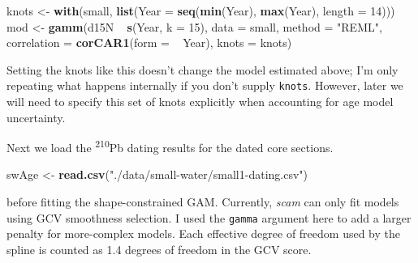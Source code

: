 \documentclass[12pt,]{article}
\newenvironment{Shaded}{\begin{snugshade}}{\end{snugshade}}
\newcommand{\KeywordTok}[1]{\textcolor[rgb]{0.13,0.29,0.53}{\textbf{{#1}}}}
\newcommand{\DataTypeTok}[1]{\textcolor[rgb]{0.13,0.29,0.53}{{#1}}}
\newcommand{\DecValTok}[1]{\textcolor[rgb]{0.00,0.00,0.81}{{#1}}}
\newcommand{\FloatTok}[1]{\textcolor[rgb]{0.00,0.00,0.81}{{#1}}}
\newcommand{\StringTok}[1]{\textcolor[rgb]{0.31,0.60,0.02}{{#1}}}
\newcommand{\NormalTok}[1]{{#1}}
\begin{document}
\begin{Shaded}
\begin{Highlighting}[]
\NormalTok{knots <-}\StringTok{ }\KeywordTok{with}\NormalTok{(small, }\KeywordTok{list}\NormalTok{(}\DataTypeTok{Year =} \KeywordTok{seq}\NormalTok{(}\KeywordTok{min}\NormalTok{(Year), }\KeywordTok{max}\NormalTok{(Year), }\DataTypeTok{length =} \DecValTok{14}\NormalTok{)))}
\NormalTok{mod <-}\StringTok{ }\KeywordTok{gamm}\NormalTok{(d15N ~}\StringTok{ }\KeywordTok{s}\NormalTok{(Year, }\DataTypeTok{k =} \DecValTok{15}\NormalTok{), }\DataTypeTok{data =} \NormalTok{small, }\DataTypeTok{method =} \StringTok{"REML"}\NormalTok{,}
            \DataTypeTok{correlation =} \KeywordTok{corCAR1}\NormalTok{(}\DataTypeTok{form =} \NormalTok{~}\StringTok{ }\NormalTok{Year),}
            \DataTypeTok{knots =} \NormalTok{knots)}
\end{Highlighting}
\end{Shaded}

Setting the knots like this doesn't change the model estimated above;
I'm only repeating what happens internally if you don't supply
\texttt{knots}. However, later we will need to specify this set of knots
explicitly when accounting for age model uncertainty.

Next we load the \textsuperscript{210}Pb dating results for the dated
core sections.

\begin{Shaded}
\begin{Highlighting}[]
\NormalTok{swAge <-}\StringTok{ }\KeywordTok{read.csv}\NormalTok{(}\StringTok{"./data/small-water/small1-dating.csv"}\NormalTok{)}
\end{Highlighting}
\end{Shaded}

before fitting the shape-constrained GAM. Currently, \emph{scam} can
only fit models using GCV smoothness selection. I used the
\texttt{gamma} argument here to add a larger penalty for more-complex
models. Each effective degree of freedom used by the spline is counted
as 1.4 degrees of freedom in the GCV score.

\begin{Shaded}
\end{Shaded}
\end{document}
